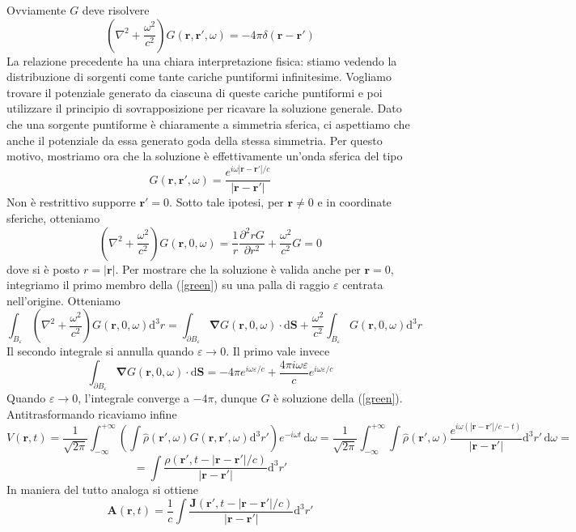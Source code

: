 \documentclass[a4paper,11pt]{book}
\newcommand{\dif}{\mathrm{d}}
\newcommand{\der}[3][]{\frac{\partial ^{#1}#2}{\partial {#3}^{#1}}}
\let\oldnabla\nabla
\renewcommand{\nabla}{\vec{\oldnabla}}
\newcommand{\lap}{\oldnabla^2}
\renewcommand{\vec}[1]{\mathbf{#1}}
\newcommand{\fourier}[2]{\frac{1}{\sqrt{2\pi}}\int_{-\infty}^{+\infty}#1\,\dif#2}
\theoremstyle{theorem}
\theoremstyle{definition}
\begin{document}
Ovviamente $G$ deve risolvere
\begin{equation}\left(\lap+\frac{\omega^2}{c^2}\right)G(\vec{r},\vec{r}',\omega)=-4\pi\delta(\vec{r}-\vec{r}')\label{green}\end{equation}
La relazione precedente ha una chiara interpretazione fisica: stiamo vedendo la distribuzione di sorgenti come tante cariche puntiformi infinitesime. Vogliamo trovare il potenziale generato da ciascuna di queste cariche puntiformi e poi utilizzare il principio di sovrapposizione per ricavare la soluzione generale. Dato che una sorgente puntiforme è chiaramente a simmetria sferica, ci aspettiamo che anche il potenziale da essa generato goda della stessa simmetria. Per questo motivo, mostriamo ora che la soluzione è effettivamente un'onda sferica del tipo
\[G(\vec{r},\vec{r}',\omega)=\frac{e^{i\omega|\vec{r}-\vec{r}'|/c}}{|\vec{r}-\vec{r}'|}\]
Non è restrittivo supporre $\vec{r}'=0$. Sotto tale ipotesi, per $\vec{r}\neq0$ e in coordinate sferiche, otteniamo
\[\left(\lap+\frac{\omega^2}{c^2}\right)G(\vec{r},0,\omega)=\frac{1}{r}\der[2]{r G}{r}+\frac{\omega^2}{c^2}G=0\]
dove si è posto $r=|\vec{r}|$. Per mostrare che la soluzione è valida anche per $\vec{r}=0$, integriamo il primo membro della (\ref{green}) su una palla di raggio $\varepsilon$ centrata nell'origine. Otteniamo
\[\int_{B_\varepsilon}\left(\lap+\frac{\omega^2}{c^2}\right)G(\vec{r},0,\omega)\dif^3r=\int_{\partial B_\varepsilon}\nabla G(\vec{r},0,\omega)\cdot\dif\vec{S}+\frac{\omega^2}{c^2}\int_{B_{\varepsilon}}G(\vec{r},0,\omega)\dif^3r\]
Il secondo integrale si annulla quando $\varepsilon\to0$. Il primo vale invece
\[\int_{\partial B_\varepsilon}\nabla G(\vec{r},0,\omega)\cdot\dif\vec{S}=-4\pi e^{i\omega\varepsilon/c}+\frac{4\pi i\omega\varepsilon}{c}e^{i\omega\varepsilon/c}\]
Quando $\varepsilon\to0$, l'integrale converge a $-4\pi$, dunque $G$ è soluzione della (\ref{green}). Antitrasformando ricaviamo infine
\[V(\vec{r},t)=\fourier{\left(\int \hat{\rho}(\vec{r}',\omega)G(\vec{r},\vec{r}',\omega)\dif^3r'\right)e^{-i\omega t}}{\omega}=\fourier{\int \hat{\rho}(\vec{r}',\omega)\frac{e^{i\omega(|\vec{r}-\vec{r}'|/c-t)}}{|\vec{r}-\vec{r}'|}\dif^3r'}{\omega}=\]\begin{equation}=\int\frac{\rho(\vec{r}',t-|\vec{r}-\vec{r}'|/c)}{|\vec{r}-\vec{r}'|}\dif^3r'\label{vrit}\end{equation}
In maniera del tutto analoga si ottiene
\begin{equation}\vec{A}(\vec{r},t)=\frac{1}{c}\int\frac{\vec{J}(\vec{r}',t-|\vec{r}-\vec{r}'|/c)}{|\vec{r}-\vec{r}'|}\dif^3r'\label{arit}\end{equation}
\end{document}
